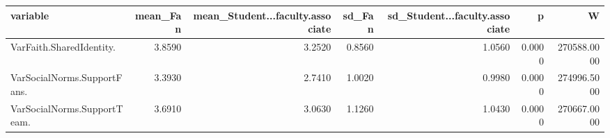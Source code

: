 \begin{tabular}{lrrrrrr}
  \hline
variable & mean\_Fan & mean\_Student...faculty.associate & sd\_Fan & sd\_Student...faculty.associate & p & W \\ 
  \hline
VarFaith.SharedIdentity. & 3.8590 & 3.2520 & 0.8560 & 1.0560 & 0.0000 & 270588.0000 \\ 
  VarSocialNorms.SupportFans. & 3.3930 & 2.7410 & 1.0020 & 0.9980 & 0.0000 & 274996.5000 \\ 
  VarSocialNorms.SupportTeam. & 3.6910 & 3.0630 & 1.1260 & 1.0430 & 0.0000 & 270667.0000 \\ 
   \hline
\end{tabular}
